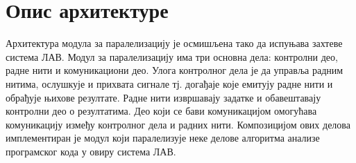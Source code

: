 \documentclass[12pt,oneside]{memoir}
\begin{document}
\section{Опис архитектуре}

Архитектура модула за паралелизацију је осмишљена тако да испуњава захтеве система ЛАВ. Модул за паралелизацију има три основна дела: контролни део, радне нити и комуникациони део. Улога контролног дела је да управља радним нитима, ослушкује и прихвата сигнале тј. догађаје које емитују радне нити и обрађује 	њихове резултате. Радне нити извршавају задатке и обавештавају контролни део о резултатима. Део који се бави комуникацијом омогућава комуникацију између контролног дела и радних нити. Композицијом ових делова имплементиран је модул који паралелизује неке делове алгоритма анализе програмског кода у овиру система ЛАВ.
\newpage
\end{document}
